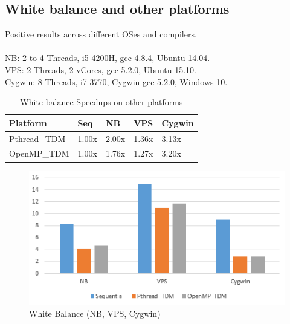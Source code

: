 \documentclass{acm_proc_article-sp}
\begin{document}
\subsection{White balance and other platforms}
Positive results across different OSes and compilers. \\ \\
NB: 2 to 4 Threads, i5-4200H, gcc 4.8.4, Ubuntu 14.04. \\
VPS: 2 Threads, 2 vCores, gcc 5.2.0, Ubuntu 15.10. \\
Cygwin: 8 Threads, i7-3770, Cygwin-gcc 5.2.0, Windows 10.
\begin{table}[H]
\centering
\caption{White balance Speedups on other platforms}
\begin{tabular}{|l|l|l|l|l|} \hline
Platform&Seq&NB&VPS&Cygwin\\ \hline
Pthread\_TDM & 1.00x & 2.00x & 1.36x & 3.13x \\ \hline
OpenMP\_TDM & 1.00x & 1.76x & 1.27x & 3.20x \\ \hline
\end{tabular}
\end{table}
\begin{figure}[H]
  \includegraphics[width=\linewidth,natwidth=473,natheight=247]{white_platforms.png}
  \caption{White Balance (NB, VPS, Cygwin)}
  \label{fig:white_platforms}
\end{figure}
\end{document}
